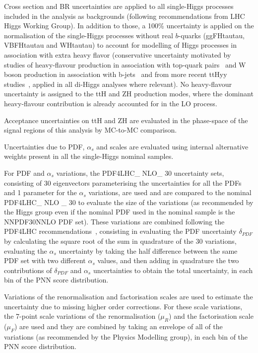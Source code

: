 Cross section and BR uncertainties are applied to all single-Higgs processes included in the analysis as backgrounds (following recommendations from LHC Higgs Working Group). In addition to those, a 100\% uncertainty is applied on the normalisation of the single-Higgs processes without real $b$-quarks (ggFHtautau, VBFHtautau and WHtautau) to account for modelling of Higgs processes in association with extra heavy flavor (conservative uncertainty motivated by studies of heavy-flavour production in association with top-quark pairs~\cite{PhysRevD.89.072012} and W boson production in association with b-jets~\cite{Aad_2013} and from more recent ttHyy studies~\cite{MorenoLlacer:2684286}, applied in all di-Higgs analyses where relevant). No heavy-flavour uncertainty is assigned to the ttH and ZH production modes, where the dominant heavy-flavour contribution is already accounted for in the LO process.

Acceptance uncertainties on ttH and ZH are evaluated in the phase-space of the signal regions of this analysis by MC-to-MC comparison.

Uncertainties due to PDF, $\alpha_s$ and scales are evaluated using internal alternative weights present in all the single-Higgs nominal samples. 

For PDF and $\alpha_s$ variations, the PDF4LHC\_ NLO\_ 30 uncertainty sets, consisting of 30 eigenvectors parameterising the uncertainties for all the PDFs and 1 parameter for the $\alpha_s$ variations, are used and are compared to the nominal PDF4LHC\_ NLO \_ 30 to evaluate the size of the variations (as recommended by the Higgs group even if the nominal PDF used in the nominal sample is the NNPDF30NNLO PDF set). These variations are combined following the PDF4LHC recommendations~\cite{Butterworth:2015oua}, consisting in evaluating the PDF uncertainty $\delta_{PDF}$ by calculating the square root of the sum in quadrature of the 30 variations, evaluating the $\alpha_s$ uncertainty by taking the half difference between the same PDF set with two different $\alpha_s$ values, and then adding in quadrature the two contributions of $\delta_{PDF}$ and $\alpha_s$ uncertainties to obtain the total uncertainty, in each bin of the PNN score distribution.

Variations of the renormalisation and factorisation scales are used to estimate the uncertainty due to missing higher order corrections. For these scale variations, the 7-point scale variations of the renormalisation ($\mu_R$) and the factorisation scale ($\mu_F$) are used and they are combined by taking an envelope of all of the variations (as recommended by the Physics Modelling group), in each bin of the PNN score distribution.

